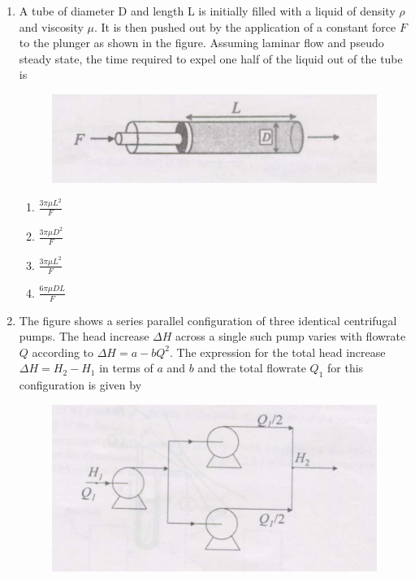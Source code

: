 \documentclass[journal,12pt,onecolumn]{IEEEtran}
\theoremstyle{remark}
\begin{document}
\begin{enumerate}
\begin{multicols}{4}
    \begin{enumerate}
        \item 1574 N
        \item 1970 N
        \item 5942 N
        \item 7533 N
    \end{enumerate}
\end{multicols}

    \item A tube of diameter D and length L is initially filled with a liquid of density $\rho$ and viscosity $\mu$. It is then pushed out by the application of a constant force $F$ to the plunger as shown in the figure. Assuming laminar flow and pseudo steady state, the time required to expel one half of the liquid out of the tube is 

    \begin{figure}[H]
        \centering
        \includegraphics[width=0.5\columnwidth]{figs/37.png}
        \caption{}
        \label{fig:37}
    \end{figure}

    \begin{enumerate}
        \item $\frac{3\pi \mu L^2}{F}$
        \item $\frac{3\pi \mu D^2}{F}$
        \item $\frac{3\pi \mu L^2}{F}$
        \item $\frac{6\pi \mu D L}{F}$
    \end{enumerate}

    \item The figure shows a series parallel configuration of three identical centrifugal pumps. The head increase $\Delta H$ across a single such pump varies with flowrate $Q$ according to $\Delta H=a-bQ^2$. The expression for the total head increase $\Delta H=H_2 - H_1$ in terms of $a$ and $b$ and the total flowrate $Q_1$ for this configuration is given by 

    \begin{figure}[H]
        \centering
        \includegraphics[width=0.5\columnwidth]{figs/38.png}
        \caption{}
        \label{fig:38}
    \end{figure}


\end{enumerate}
\end{document}
